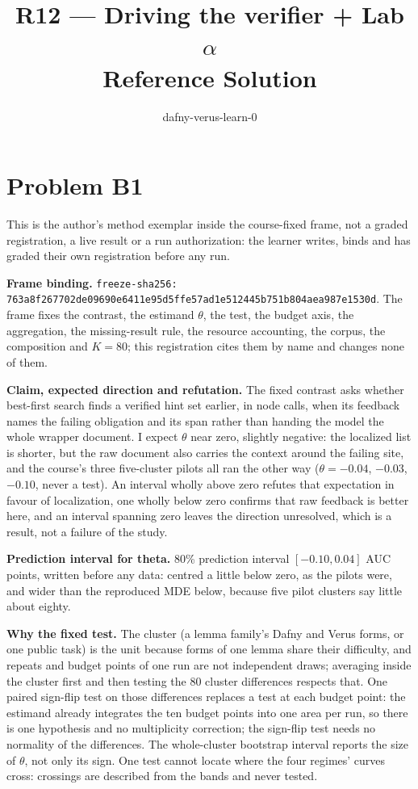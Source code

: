 \documentclass[11pt]{article}
\title{R12 --- Driving the verifier + Lab $\alpha$ \\ \large Reference Solution}
\author{dafny-verus-learn-0}
\date{}
\begin{document}
\maketitle
\sloppy
\section*{Problem B1}\label{ans:B1}
\begin{answer}
This is the author's method exemplar inside the course-fixed frame, not a graded
registration, a live result or a run authorization: the learner writes, binds and
has graded their own registration before any run.

\textbf{Frame binding.} \texttt{freeze-sha256: 763a8f267702de09690e6411e95d5ffe57ad1e512445b751b804aea987e1530d}. The frame fixes the
contrast, the estimand $\theta$, the test, the budget axis, the aggregation, the
missing-result rule, the resource accounting, the corpus, the composition and
$K = 80$; this registration cites them by name and changes none of them.

\textbf{Claim, expected direction and refutation.} The fixed contrast asks
whether best-first search finds a verified hint set earlier, in node calls, when
its feedback names the failing obligation and its span rather than handing the
model the whole wrapper document. I expect $\theta$ near zero, slightly negative:
the localized list is shorter, but the raw document also carries the context
around the failing site, and the course's three five-cluster pilots all ran the
other way ($\theta = -0.04$, $-0.03$, $-0.10$, never a test). An interval wholly
above zero refutes that expectation in favour of localization, one wholly below
zero confirms that raw feedback is better here, and an interval spanning zero
leaves the direction unresolved, which is a result, not a failure of the study.

\textbf{Prediction interval for theta.} 80\% prediction interval
$[-0.10, 0.04]$ AUC points, written before any data: centred a little below
zero, as the pilots were, and wider than the reproduced MDE below, because five
pilot clusters say little about eighty.

\textbf{Why the fixed test.} The cluster (a lemma family's Dafny and Verus forms,
or one public task) is the unit because forms of one lemma share their
difficulty, and repeats and budget points of one run are not independent draws;
averaging inside the cluster first and then testing the 80 cluster differences
respects that. One paired sign-flip test on those differences replaces a test at
each budget point: the estimand already integrates the ten budget points into one
area per run, so there is one hypothesis and no multiplicity correction; the
sign-flip test needs no normality of the differences. The whole-cluster bootstrap
interval reports the size of $\theta$, not only its sign. One test cannot locate
where the four regimes' curves cross: crossings are described from the bands and
never tested.


\end{answer}
\end{document}
